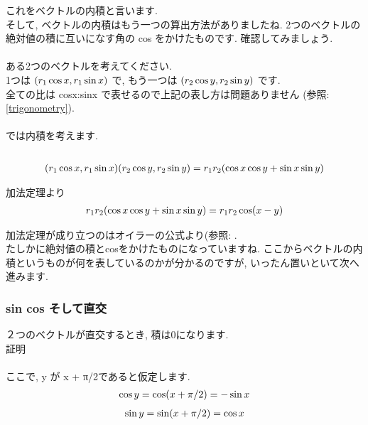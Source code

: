 \documentclass[11pt,a4paper]{jsarticle}
\begin{document}
これをベクトルの内積と言います.\\
そして, ベクトルの内積はもう一つの算出方法がありましたね. 2つのベクトルの絶対値の積に互いになす角の cos をかけたものです. 確認してみましょう.\\
\\
ある2つのベクトルを考えてください.\\
1つは $(\mathstrut r_1\cos x , \mathstrut r_1\sin x)$ で, もう一つは 
$(\mathstrut r_2\cos y , \mathstrut r_2\sin y)$ です.
\\
全ての比は cosx:sinx で表せるので上記の表し方は問題ありません (参照: \ref{trigonometry}).\\
\\
では内積を考えます.\\
\\
\begin{eqnarray}
(\mathstrut r_1\cos x, \mathstrut r_1\sin x)(\mathstrut r_2\cos y, \mathstrut r_2\sin y) = \mathstrut r_1\mathstrut r_2(\cos x\cos y + \sin x\sin y)
\end{eqnarray}

加法定理より
\begin{eqnarray}
\mathstrut r_1\mathstrut r_2(\cos x\cos y + \sin x\sin y) = \mathstrut r_1\mathstrut r_2\cos (\mathstrut x- \mathstrut y)
\end{eqnarray}

加法定理が成り立つのはオイラーの公式より(参照: \label{addition_theorem}.\\
たしかに絶対値の積とcosをかけたものになっていますね. ここからベクトルの内積というものが何を表しているのかが分かるのですが, いったん置いといて次へ進みます.\\

\subsubsection{sin cos そして直交}
２つのベクトルが直交するとき, 積は0になります.\\
証明\\
\\
ここで, y が x + π/2であると仮定します.\\
\begin{eqnarray}
\cos y = \cos (\mathstrut x + \pi/2) = -\sin x
\label{eq:costosin}
\end{eqnarray}
\begin{eqnarray}
\sin y = \sin (\mathstrut x + \pi/2) = \cos x
\label{eq:sintocos}
\end{eqnarray}
\end{document}
